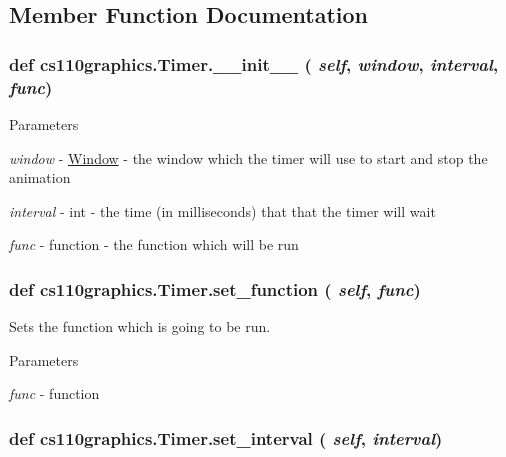 \subsection{Member Function Documentation}
\hypertarget{classcs110graphics_1_1Timer_a7d40cc83eb4083d4afd97c3ce5279e1a}{
\subsubsection[{\_\-\_\-init\_\-\_\-}]{\setlength{\rightskip}{0pt plus 5cm}def cs110graphics.Timer.\_\-\_\-init\_\-\_\- ( {\em self}, \/   {\em window}, \/   {\em interval}, \/   {\em func})}}
\label{classcs110graphics_1_1Timer_a7d40cc83eb4083d4afd97c3ce5279e1a}

\begin{DoxyParams}{Parameters}
\item[{\em window}]-\/ \hyperlink{classcs110graphics_1_1Window}{Window} -\/ the window which the timer will use to start and stop the animation \item[{\em interval}]-\/ int -\/ the time (in milliseconds) that that the timer will wait \item[{\em func}]-\/ function -\/ the function which will be run \end{DoxyParams}
\hypertarget{classcs110graphics_1_1Timer_aba0aae9c8bfff7c626112f0020383a8d}{
\subsubsection[{set\_\-function}]{\setlength{\rightskip}{0pt plus 5cm}def cs110graphics.Timer.set\_\-function ( {\em self}, \/   {\em func})}}
\label{classcs110graphics_1_1Timer_aba0aae9c8bfff7c626112f0020383a8d}


Sets the function which is going to be run. 
\begin{DoxyParams}{Parameters}
\item[{\em func}]-\/ function \end{DoxyParams}
\hypertarget{classcs110graphics_1_1Timer_ae176b030095b0d96fa0e91f2c398c40a}{
\subsubsection[{set\_\-interval}]{\setlength{\rightskip}{0pt plus 5cm}def cs110graphics.Timer.set\_\-interval ( {\em self}, \/   {\em interval})}}
\label{classcs110graphics_1_1Timer_ae176b030095b0d96fa0e91f2c398c40a}


